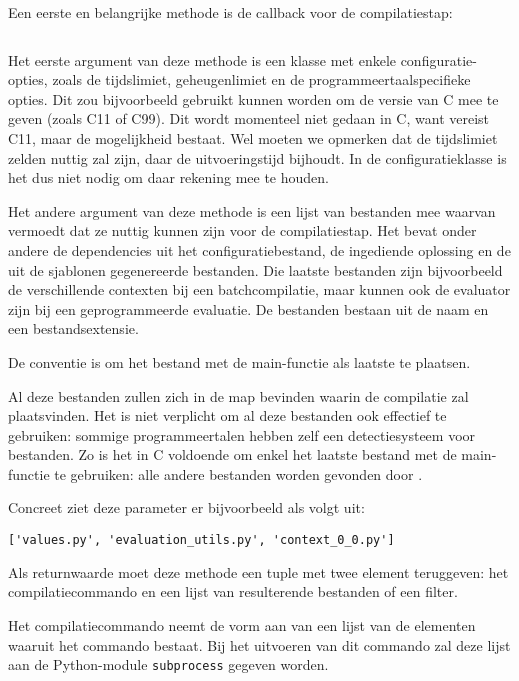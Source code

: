 Een eerste en belangrijke methode is de callback voor de compilatiestap:

\inputminted[firstline=12,lastline=17,gobble=4]{python}{sources/c-config.py}

Het eerste argument van deze methode is een klasse met enkele configuratie-opties, zoals de tijdslimiet, geheugenlimiet en de programmeertaalspecifieke opties.
Dit zou bijvoorbeeld gebruikt kunnen worden om de versie van C mee te geven (zoals C11 of C99).
Dit wordt momenteel niet gedaan in C, want \tested{} vereist C11, maar de mogelijkheid bestaat.
Wel moeten we opmerken dat de tijdslimiet zelden nuttig zal zijn, daar \tested{} de uitvoeringstijd bijhoudt.
In de configuratieklasse is het dus niet nodig om daar rekening mee te houden.

Het andere argument van deze methode is een lijst van bestanden mee waarvan \tested{} vermoedt dat ze nuttig kunnen zijn voor de compilatiestap.
Het bevat onder andere de dependencies uit het configuratiebestand, de ingediende oplossing en de uit de sjablonen gegenereerde bestanden.
Die laatste bestanden zijn bijvoorbeeld de verschillende contexten bij een batchcompilatie, maar kunnen ook de evaluator zijn bij een geprogrammeerde evaluatie.
De bestanden bestaan uit de naam en een bestandsextensie.

De conventie is om het bestand met de main-functie als laatste te plaatsen.

Al deze bestanden zullen zich in de map bevinden waarin de compilatie zal plaatsvinden.
Het is niet verplicht om al deze bestanden ook effectief te gebruiken: sommige programmeertalen hebben zelf een detectiesysteem voor bestanden.
Zo is het in C voldoende om enkel het laatste bestand met de main-functie te gebruiken: alle andere bestanden worden gevonden door .

Concreet ziet deze parameter er bijvoorbeeld als volgt uit:

\begin{verbatim}
['values.py', 'evaluation_utils.py', 'context_0_0.py']
\end{verbatim}

Als returnwaarde moet deze methode een tuple met twee element teruggeven: het compilatiecommando en een lijst van resulterende bestanden of een filter.

Het compilatiecommando neemt de vorm aan van een lijst van de elementen waaruit het commando bestaat.
Bij het uitvoeren van dit commando zal deze lijst aan de Python-module \texttt{subprocess} gegeven worden.

